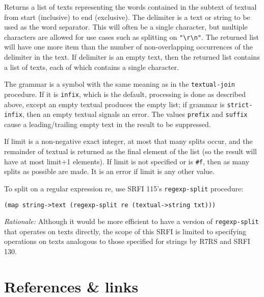 \begin{entry}{%
  }

  Returns a list of texts representing the words
  contained in the subtext of textual from start (inclusive) to end
  (exclusive). The delimiter is a text or string to be used as the
  word separator. This will often be a single character, but multiple
  characters are allowed for use cases such as splitting on
  \texttt{"\textbackslash{}r\textbackslash{}n"}. The returned list
  will have one more item than the number of non-overlapping
  occurrences of the delimiter in the text. If delimiter is an empty
  text, then the returned list contains a list of texts, each of which
  contains a single character.

  The grammar is a symbol with the same meaning as in the
  \texttt{textual-join} procedure. If it is \texttt{infix}, which is
  the default, processing is done as described above, except an empty
  textual produces the empty list; if grammar is
  \texttt{strict-infix}, then an empty textual signals an error. The
  values \texttt{prefix} and \texttt{suffix} cause a leading/trailing
  empty text in the result to be suppressed.

  If limit is a non-negative exact integer, at most that many splits
  occur, and the remainder of textual is returned as the final element
  of the list (so the result will have at most limit+1 elements). If
  limit is not specified or is \texttt{\#f}, then as many splits as
  possible are made. It is an error if limit is any other value.

  To split on a regular expression re, use SRFI 115's
  \texttt{regexp-split} procedure:

\begin{verbatim}
(map string->text (regexp-split re (textual->string txt)))
\end{verbatim}

  \emph{Rationale:} Although it would be more efficient to have a
  version of \texttt{regexp-split} that operates on texts directly,
  the scope of this SRFI is limited to specifying operations on texts
  analogous to those specified for strings by R7RS and SRFI 130.
\end{entry}

\section{{References \& links}}\label{references-links}

